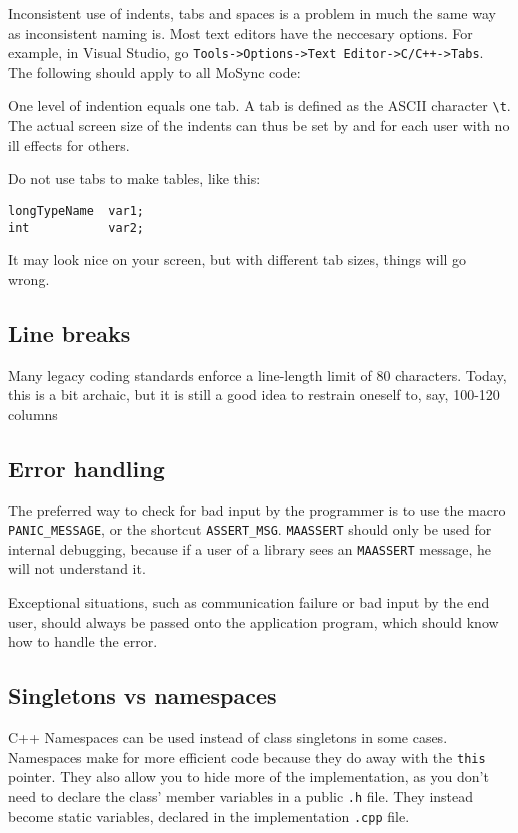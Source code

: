 \documentclass {article}
\begin{document}
Inconsistent use of indents, tabs and spaces is a problem in much the same way as inconsistent naming is. Most text editors have the neccesary options. For example, in Visual Studio, go \verb|Tools->Options->Text Editor->C/C++->Tabs|. The following should apply to all MoSync code:

One level of indention equals one tab. A tab is defined as the ASCII character \verb|\t|. The actual screen size of the indents can thus be set by and for each user with no ill effects for others.

Do not use tabs to make tables, like this:
\begin{verbatim} 
longTypeName  var1;
int           var2;
\end{verbatim}
It may look nice on your screen, but with different tab sizes, things will go wrong.

\subsection{Line breaks}
Many legacy coding standards enforce a line-length limit of 80 characters. Today, this is a bit archaic, but it is still a good idea to restrain oneself to, say, 100-120 columns

\subsection{Error handling}

The preferred way to check for bad input by the programmer is to use the macro \verb|PANIC_MESSAGE|, or the shortcut \verb|ASSERT_MSG|. \verb|MAASSERT| should only be used for internal debugging, because if a user of a library sees an \verb|MAASSERT| message, he will not understand it.

Exceptional situations, such as communication failure or bad input by the end user, should always be passed onto the application program, which should know how to handle the error.


\subsection{Singletons vs namespaces}

C++ Namespaces can be used instead of class singletons in some cases. Namespaces make for more efficient code because they do away with the \verb|this| pointer. They also allow you to hide more of the implementation, as you don't need to declare the class' member variables in a public \verb|.h| file. They instead become static variables, declared in the implementation \verb|.cpp| file.
\end{document}
